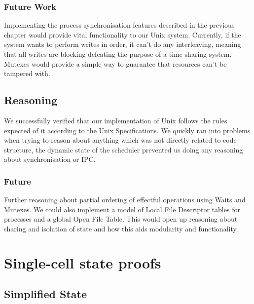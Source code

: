 \documentclass[logo,bsc,singlespacing,parskip]{infthesis}
\begin{document}
\subsection*{Future Work}
Implementing the process synchronisation features described in the previous chapter would provide vital functionality to our Unix system. Currently, if the system wants to perform writes in order, it can't do any interleaving, meaning that all writes are blocking defeating the purpose of a time-sharing system. Mutexes would provide a simple way to guarantee that resources can't be tampered with.

\section{Reasoning}
We successfully verified that our implementation of Unix follows the rules expected of it according to the Unix Specifications. We quickly ran into problems when trying to reason about anything which was not directly related to code structure, the dynamic state of the scheduler prevented us doing any reasoning about synchronisation or IPC.
\subsection*{Future}
Further reasoning about partial ordering of effectful operations using Waits and Mutexes. We could also implement a model of Local File Descriptor tables for processes and a global Open File Table. This would open up reasoning about sharing and isolation of state and how this aids modularity and functionality.  

% 




\appendix

\chapter{Single-cell state proofs} 

\section{Simplified State} \label{full-simplified-single-cell-state-proof}
\end{document}
